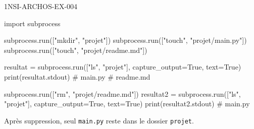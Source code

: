 \begin{corrige}{1NSI-ARCHOS-EX-004}
\begin{python}
import subprocess

subprocess.run(["mkdir", "projet"])
subprocess.run(["touch", "projet/main.py"])
subprocess.run(["touch", "projet/readme.md"])

resultat = subprocess.run(["ls", "projet"], capture_output=True, text=True)
print(resultat.stdout)  # main.py
# readme.md

subprocess.run(["rm", "projet/readme.md"])
resultat2 = subprocess.run(["ls", "projet"], capture_output=True, text=True)
print(resultat2.stdout)  # main.py
\end{python}
Après suppression, seul \lstinline{main.py} reste dans le dossier \lstinline{projet}.
\end{corrige}
